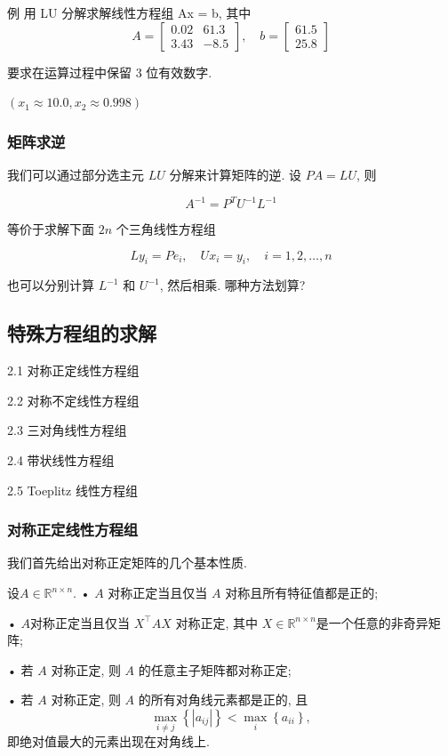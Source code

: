 \documentclass[12pt,a4paper]{article}
\begin{document}
{例} 用 LU 分解求解线性方程组 Ax = b, 其中
\begin{equation}
A=\left[\begin{array}{cc}{0.02} & {61.3} \\ {3.43} & {-8.5}\end{array}\right], \quad b=\left[\begin{array}{c}{61.5} \\ {25.8}\end{array}\right]
\end{equation}

要求在运算过程中保留 3 位有效数字.	

$(x_1 ≈ 10.0, x_2 ≈ 0.998)$


\subsubsection{矩阵求逆}
我们可以通过部分选主元 $LU$ 分解来计算矩阵的逆. 设 $P A = LU$, 则

$$
A^{-1}=P^{T} U^{-1} L^{-1}
$$

等价于求解下面 $2n$ 个三角线性方程组

$$
L y_{i}=P e_{i}, \quad U x_{i}=y_{i}, \quad i=1,2, \ldots, n
$$

也可以分别计算 $L^{-1}$ 和 $U^{−1}$, 然后相乘. 哪种方法划算?

\subsection{特殊方程组的求解}

2.1 对称正定线性方程组

2.2 对称不定线性方程组

2.3 三对角线性方程组

2.4 带状线性方程组

2.5 Toeplitz 线性方程组

\subsubsection{对称正定线性方程组}

我们首先给出对称正定矩阵的几个基本性质.

\begin{theorem}
	设$ A ∈ \mathbb{R}^{n×n}$.
	• $A$ 对称正定当且仅当 $A$ 对称且所有特征值都是正的;
	
	• $A $对称正定当且仅当 $X^{⊺}AX$ 对称正定, 其中 $X ∈ \mathbb{R}^{n×n} $是一个任意的非奇异矩阵;
	
	• 若 $A$ 对称正定, 则 $A$ 的任意主子矩阵都对称正定;
	
	• 若 $A$ 对称正定, 则 $A$ 的所有对角线元素都是正的, 且
	$$
	\max _{i \neq j}\left\{\left|a_{i j}\right|\right\}<\max _{i}\left\{a_{i i}\right\}
	,$$即绝对值最大的元素出现在对角线上.
\end{theorem}
\end{document}
